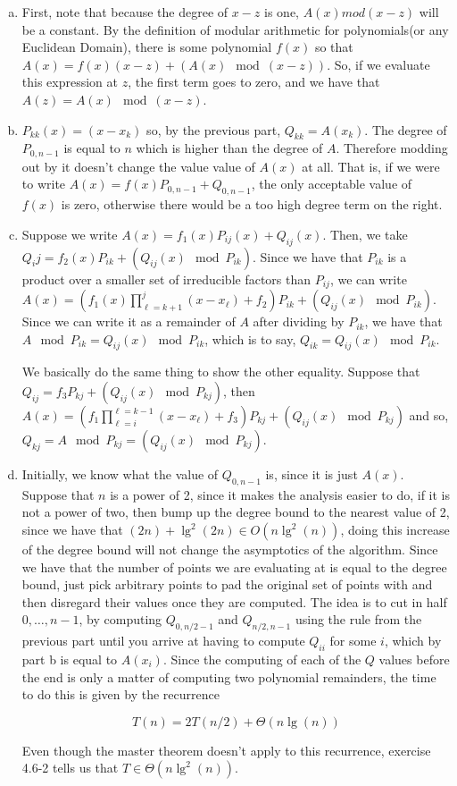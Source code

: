 \documentclass{article}
\begin{document}
\begin{enumerate}[a.]
\item
First, note that because the degree of $x-z$ is one, $A(x)mod(x-z)$ will be a constant. By the definition of modular arithmetic for polynomials(or any Euclidean Domain), there is some polynomial $f(x)$ so that $A(x) = f(x)(x-z) + (A(x) \mod(x-z))$. So, if we evaluate this expression at $z$, the first term goes to zero, and we have that $A(z) = A(x)\mod (x-z)$.
\item
$P_{kk}(x) = (x-x_k)$ so, by the previous part, $Q_{kk} = A(x_k)$. The degree of $P_{0,n-1}$ is equal to $n$ which is higher than the degree of $A$. Therefore modding out by it doesn't change the value value of $A(x)$ at all. That is, if we were to write $A(x) = f(x) P_{0,n-1} + Q_{0,n-1}$, the only acceptable value of $f(x)$ is zero, otherwise there would be a too high degree term on the right.
\item
Suppose we write $A(x) = f_1(x) P_{ij}(x) +Q_{ij}(x)$. Then, we take $Q_ij = f_2(x) P_{ik} + (Q_{ij}(x) \mod P_{ik})$. Since we have that $P_{ik}$ is a product over a smaller set of irreducible factors than $P_{ij}$, we can write $A(x) =(f_1(x)\prod_{\ell = k+1}^j (x-x_\ell) + f_2) P_{ik} + (Q_{ij}(x) \mod P_{ik})$. Since we can write it as a remainder of $A$ after dividing by $P_{ik}$, we have that $A \mod P_{ik} =  Q_{ij}(x) \mod P_{ik}$, which is to say,  $Q_{ik} =  Q_{ij}(x) \mod P_{ik}$.

We basically do the same thing to show the other equality. Suppose that $Q_{ij} = f_3 P_{kj} +   (Q_{ij}(x) \mod P_{kj})$, then $A(x) = (f_1\prod_{\ell =i}^{\ell = k-1} (x-x_\ell) + f_3)P_{kj} +  (Q_{ij}(x) \mod P_{kj})$ and so, $Q_{kj} = A \mod P_{kj} =  (Q_{ij}(x) \mod P_{kj})$.

\item
Initially, we know what the value of $Q_{0,n-1}$ is, since it is just $A(x)$. Suppose that $n$ is a power of 2, since it makes the analysis easier to do, if it is not a power of two, then bump up the degree bound to the nearest value of 2, since we have that $(2n) + \lg^2(2n) \in O(n\lg^2(n))$, doing this increase of the degree bound will not change the asymptotics of the algorithm. Since we have that the number of points we are evaluating at is equal to the degree bound, just pick arbitrary points to pad the original set of points with and then disregard their values once they are computed. The idea is to cut in half $0,\ldots,n-1$, by computing $Q_{0,n/2-1}$ and $Q_{n/2,n-1}$ using the rule from the previous part until you arrive at having to compute $Q_{ii}$ for some $i$, which by part b is equal to $A(x_i)$. Since the computing of each of the $Q$ values before the end is only a matter of computing two polynomial remainders, the time to do this is given by the recurrence

\[
T(n) = 2 T(n/2) +\Theta(n\lg(n))
\]

 Even though the master theorem doesn't apply to this recurrence, exercise 4.6-2 tells us that $T\in \Theta(n\lg^2(n))$.


\end{enumerate}
\end{document}
